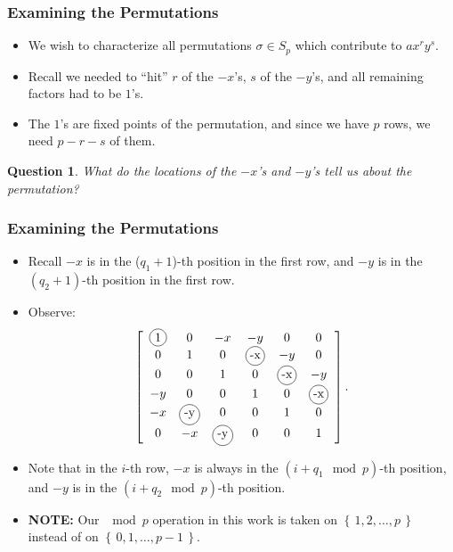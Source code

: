 \documentclass{beamer}
\theoremstyle{plain}
\newtheorem{question}[theorem]{Question}
\theoremstyle{definition}
\theoremstyle{remark}
\newcommand{\bee}{\begin{equation}\begin{aligned}}
\newcommand{\eee}{\end{aligned}\end{equation}}
\newcommand*\circled[1]{\tikz[baseline=(char.base)]{
            \node[shape=circle,draw,inner sep=2pt] (char) {#1};}}
\renewcommand{\'}{\hspace{0.5mm}'}		%
\renewcommand{\Set}[1]{\left\{\,#1\,\right\}}	%
\begin{document}



\begin{frame}
\frametitle{Examining the Permutations}

\begin{itemize}
	\item We wish to characterize all permutations
	$\sigma \in S_p$ which contribute to $ax^ry^s$. 
	\item Recall we needed to ``hit'' $r$ of the 
	$-x$'s, $s$ of the $-y$'s, and all remaining
	factors had to be $1$'s. 
	\item The $1$'s are fixed points of the permutation, and
	since we have $p$ rows, we need $p - r - s$ of them.
\end{itemize}
\begin{question}
	What do the locations of the $-x$'s and $-y$'s
	tell us about the permutation?
\end{question}

\end{frame}


\begin{frame}
\frametitle{Examining the Permutations}

\begin{itemize}
	\item Recall $-x$ is in the ($q_1 + 1$)-th
	position in the first row, and $-y$ is in the 
	$(q_2 + 1)$-th position in the first row. 
	\item Observe:
	\small
	\bee
		\left[
		\begin{array}{cccccc}
		\circled{1} & 0 & -x & -y & 0 & 0\\
		0 & 1 & 0 & \circled{-x} & -y & 0\\
		0 & 0 & 1 & 0 & \circled{-x} & -y\\
		-y & 0 & 0 & 1 & 0 & \circled{-x}\\
		-x & \circled{-y} & 0 & 0 & 1 & 0\\
		0 & -x & \circled{-y} & 0 & 0 & 1\\
		\end{array} 
		\right]. 
	\eee
	\normalsize
	\item Note that in the $i$-th row, 
	$-x$ is always in the $(i + q_1 \mod p)$-th
	position, and $-y$ is in the $(i + q_2 \mod p)$-th position. 
	\item \textbf{NOTE:} Our $\mod p$ operation in 
	this work
	is taken on $\Set{1,2,\hdots, p}$ instead of 
	on $\Set{0,1,\hdots, p - 1}$. 
\end{itemize}

\end{frame}
\end{document}
